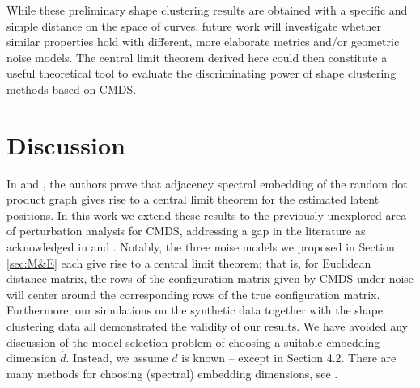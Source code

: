 While these preliminary shape clustering results are obtained with a specific and simple distance on the space of curves, future work will investigate whether similar properties hold with different, more elaborate metrics and/or geometric noise models. The central limit theorem derived here could then constitute a useful theoretical tool to evaluate the discriminating power of shape clustering methods based on CMDS.

\section{Discussion}
\label{D}

In \citet{Athreya2016} and \citet{OMNI}, the authors prove that adjacency spectral embedding of the random dot product graph gives rise to a central limit theorem for the estimated latent positions. In this work we extend these results to the previously unexplored area of perturbation analysis for CMDS, addressing a gap in the literature as acknowledged in \citet{Fan} and \citet{Peterfreund&Gavish}. Notably, the three noise models we proposed in Section \ref{sec:M&E} each give rise to a central limit theorem; that is, for Euclidean distance matrix, the rows of the configuration matrix given by CMDS under noise will center around the corresponding rows of the true configuration matrix. Furthermore, our simulations on the synthetic data together with the shape clustering data all demonstrated the validity of our results. We have avoided any discussion of the model selection problem of choosing a suitable embedding dimension $\hat{d}$. Instead, we assume $d$ is known -- except in Section 4.2. There are many methods for choosing (spectral) embedding dimensions, see \cite{Zhu&Ghodsi, Jackson, Chatterjee}. 

